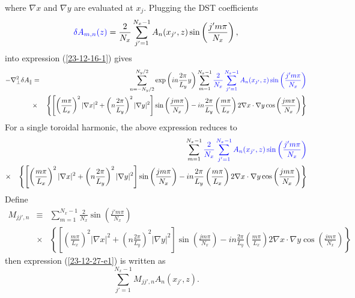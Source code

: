 \documentclass{llncs}
\newcommand{\tmcolor}[2]{{\color{#1}{#2}}}
\begin{document}
where $\nabla x$ and $\nabla y$ are evaluated at $x_j$. Plugging the DST
coefficients
\begin{equation}
  \tmcolor{blue}{\delta A_{m, n} (z)} = \frac{2}{N_x} \sum_{j' = 1}^{N_x - 1}
  A_n (x_{j'}, z) \sin \left( \frac{j' m \pi}{N_x} \right),
\end{equation}
into expression (\ref{23-12-16-1}) gives
\begin{eqnarray*}
  - \nabla_{\perp}^2 \delta A_{\parallel} & = & \sum_{n = - N_y / 2}^{N_y / 2}
  \exp \left( i n \frac{2 \pi}{L_y} y \right) \sum_{m = 1}^{N_x - 1}
  \tmcolor{blue}{\frac{2}{N_x} \sum_{j' = 1}^{N_x - 1} A_n (x_{j'}, z) \sin
  \left( \frac{j' m \pi}{N_x} \right)}\\
  & \times & \left\{ \left[ \left( \frac{m \pi}{L_x} \right)^2 | \nabla x|^2
  + \left( n \frac{2 \pi}{L_y} \right)^2 | \nabla y|^2 \right] \sin \left(
  \frac{j m \pi}{N_x} \right) - i n \frac{2 \pi}{L_y} \left( \frac{m \pi}{L_x}
  \right) 2 \nabla x \cdot \nabla y \cos \left( \frac{j m \pi}{N_x} \right)
  \right\}
\end{eqnarray*}
For a single toroidal harmonic, the above expression reduces to
\begin{eqnarray}
  &  & \sum_{m = 1}^{N_x - 1} \tmcolor{blue}{\frac{2}{N_x} \sum_{j' = 1}^{N_x
  - 1} A_n (x_{j'}, z) \sin \left( \frac{j' m \pi}{N_x} \right)} \nonumber\\
  & \times & \left\{ \left[ \left( \frac{m \pi}{L_x} \right)^2 | \nabla x|^2
  + \left( n \frac{2 \pi}{L_y} \right)^2 | \nabla y|^2 \right] \sin \left(
  \frac{j m \pi}{N_x} \right) - i n \frac{2 \pi}{L_y} \left( \frac{m \pi}{L_x}
  \right) 2 \nabla x \cdot \nabla y \cos \left( \frac{j m \pi}{N_x} \right)
  \right\}  \label{23-12-27-e1}
\end{eqnarray}
Define
\begin{eqnarray*}
  M_{j j', n} & \equiv & \sum_{m = 1}^{N_x - 1} \frac{2}{N_x} \sin \left(
  \frac{j' m \pi}{N_x} \right)\\
  & \times & \left\{ \left[ \left( \frac{m \pi}{L_x} \right)^2 | \nabla x|^2
  + \left( n \frac{2 \pi}{L_y} \right)^2 | \nabla y|^2 \right] \sin \left(
  \frac{j m \pi}{N_x} \right) - i n \frac{2 \pi}{L_y} \left( \frac{m \pi}{L_x}
  \right) 2 \nabla x \cdot \nabla y \cos \left( \frac{j m \pi}{N_x} \right)
  \right\}
\end{eqnarray*}
then expression (\ref{23-12-27-e1}) is written as
\begin{equation}
  \sum_{j' = 1}^{N_x - 1} M_{j j', n} A_n (x_{j'}, z) .
\end{equation}
\end{document}
